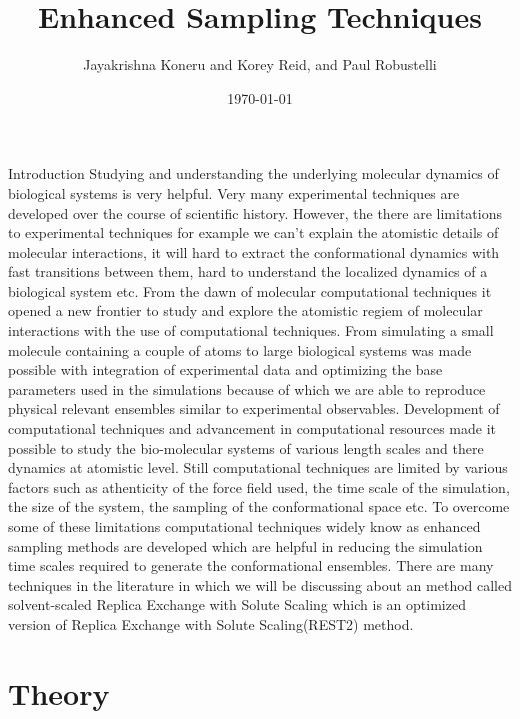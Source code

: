 \documentclass{book}
\begin{document}
\title{Enhanced Sampling Techniques}
\author{Jayakrishna Koneru and Korey Reid, and Paul Robustelli}
\date{\today}

\maketitle

\tableofcontents

\chapter{}
{Introduction}
Studying and understanding the underlying molecular dynamics of biological systems is very helpful. Very many experimental techniques are developed over the course of scientific history.
However, the there are limitations to experimental techniques for example we can't explain the atomistic details of molecular interactions, it will hard to extract the conformational dynamics
with fast transitions between them, hard to understand the localized dynamics of a biological system etc. From the dawn of molecular computational techniques it opened a new frontier to study
and explore the atomistic regiem of molecular interactions with the use of computational techniques. From simulating a small molecule containing a couple of atoms to large biological systems 
was made possible with integration of experimental data and optimizing the base parameters used in the simulations because of which we are able to reproduce physical relevant ensembles similar 
to experimental observables. Development of computational techniques and advancement in computational 
resources made it possible to study the bio-molecular systems of various length scales and there dynamics at atomistic level. Still computational techniques are limited by various factors
such as athenticity of the force field used, the time scale of the simulation, the size of the system, the sampling of the conformational space etc. To overcome some of these limitations
computational techniques widely know as enhanced sampling methods are developed which are helpful in reducing the simulation time scales required to generate the conformational ensembles.
There are many techniques in the literature in which we will be discussing about an method called solvent-scaled Replica Exchange with Solute Scaling which is an optimized version of 
Replica Exchange with Solute Scaling(REST2) method.        
  
\chapter{Theory} 
\end{document}
